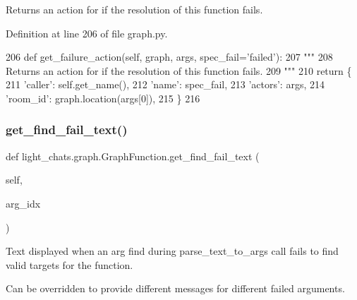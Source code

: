 \begin{DoxyVerb}Returns an action for if the resolution of this function fails.
\end{DoxyVerb}
 

Definition at line 206 of file graph.\+py.


\begin{DoxyCode}
206     \textcolor{keyword}{def }get\_failure\_action(self, graph, args, spec\_fail='failed'):
207         \textcolor{stringliteral}{"""}
208 \textcolor{stringliteral}{        Returns an action for if the resolution of this function fails.}
209 \textcolor{stringliteral}{        """}
210         \textcolor{keywordflow}{return} \{
211             \textcolor{stringliteral}{'caller'}: self.get\_name(),
212             \textcolor{stringliteral}{'name'}: spec\_fail,
213             \textcolor{stringliteral}{'actors'}: args,
214             \textcolor{stringliteral}{'room\_id'}: graph.location(args[0]),
215         \}
216 
\end{DoxyCode}
\mbox{\label{classlight__chats_1_1graph_1_1GraphFunction_a9c89db357c2eb4c4833d7f975df2e85d}} 
\subsubsection{\texorpdfstring{get\+\_\+find\+\_\+fail\+\_\+text()}{get\_find\_fail\_text()}}
{\footnotesize\ttfamily def light\+\_\+chats.\+graph.\+Graph\+Function.\+get\+\_\+find\+\_\+fail\+\_\+text (\begin{DoxyParamCaption}\item[{}]{self,  }\item[{}]{arg\+\_\+idx }\end{DoxyParamCaption})}

\begin{DoxyVerb}Text displayed when an arg find during parse_text_to_args call fails to find
valid targets for the function.

Can be overridden to provide different messages for different failed arguments.
\end{DoxyVerb}
 

